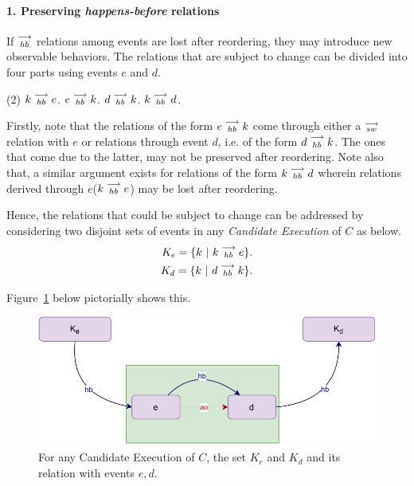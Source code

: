 
\paragraph{1. Preserving \textit{happens-before} relations}
        
    If $\stackrel{\longrightarrow}{_{hb}}$ relations among events are lost after reordering, they may introduce new observable behaviors. The relations that are subject to change can be divided into four parts using events $e$ and $d$.
    \begin{tasks}(2)
        \task $k\stackrel{\longrightarrow}{_{hb}}e$.
        \task $e\stackrel{\longrightarrow}{_{hb}}k$.
        \task $d\stackrel{\longrightarrow}{_{hb}}k$.
        \task $k\stackrel{\longrightarrow}{_{hb}}d$.
    \end{tasks}

    Firstly, note that the relations of the form $e\stackrel{\longrightarrow}{_{hb}}k$ come through either a $\stackrel{\longrightarrow}{_{sw}}$ relation with $e$ or relations through event $d$, i.e. of the form $d\stackrel{\longrightarrow}{_{hb}}k$. 
    The ones that come due to the latter, may not be preserved after reordering. 
    Note also that, a similar argument exists for relations of the form $k\stackrel{\longrightarrow}{_{hb}}d$ wherein relations derived through $e$($k\stackrel{\longrightarrow}{_{hb}}e$) may be lost after reordering. 

    Hence, the relations that could be subject to change can be addressed by considering two disjoint sets of events in any \textit{Candidate Execution} of $C$ as below.
    \begin{align*}
       K_e = \{k \ | \ k\stackrel{\longrightarrow}{_{hb}}e \}. \\
       K_d = \{k \ | \ d\stackrel{\longrightarrow}{_{hb}}k \}. 
    \end{align*}

    Figure~\ref{reord:preserve_hb(a)} below pictorially shows this.
    \begin{figure}[H]
        \centering
        \includegraphics[scale=0.7]{5.InstructionReordering/4.ValidReorderingCandidate/ProofParts/Part1/part1(a).pdf}
        \caption{For any Candidate Execution of $C$, the set $K_e$ and $K_d$ and its relation with events $e,d$.}
        \label{reord:preserve_hb(a)}
    \end{figure}
    
